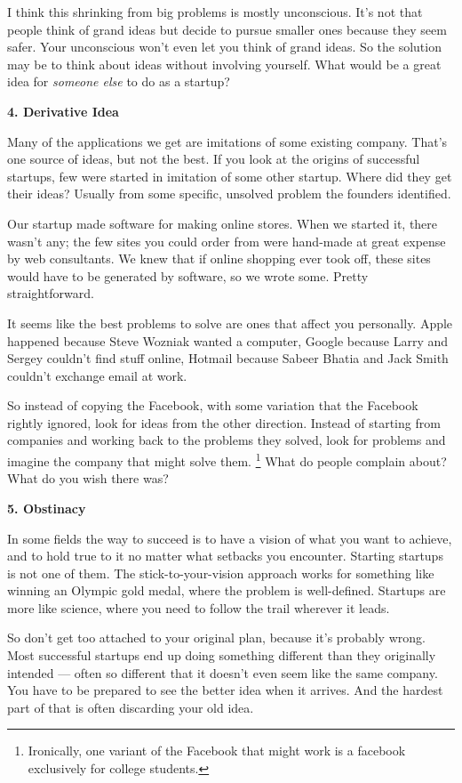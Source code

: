 \documentclass[12pt]{book}
\begin{document}
I think this shrinking from big problems is mostly unconscious. It's not
that people think of grand ideas but decide to pursue smaller ones
because they seem safer. Your unconscious won't even let you think of
grand ideas. So the solution may be to think about ideas without
involving yourself. What would be a great idea for \emph{someone else}
to do as a startup?

\textbf{4. Derivative Idea}

Many of the applications we get are imitations of some existing company.
That's one source of ideas, but not the best. If you look at the origins
of successful startups, few were started in imitation of some other
startup. Where did they get their ideas? Usually from some specific,
unsolved problem the founders identified.

Our startup made software for making online stores. When we started it,
there wasn't any; the few sites you could order from were hand-made at
great expense by web consultants. We knew that if online shopping ever
took off, these sites would have to be generated by software, so we
wrote some. Pretty straightforward.

It seems like the best problems to solve are ones that affect you
personally. Apple happened because Steve Wozniak wanted a computer,
Google because Larry and Sergey couldn't find stuff online, Hotmail
because Sabeer Bhatia and Jack Smith couldn't exchange email at work.

So instead of copying the Facebook, with some variation that the
Facebook rightly ignored, look for ideas from the other direction.
Instead of starting from companies and working back to the problems they
solved, look for problems and imagine the company that might solve them.
\footnote{Ironically, one variant of the Facebook that might work is a
facebook exclusively for college students.} What do people complain about? What do you wish
there was?

\textbf{5. Obstinacy}

In some fields the way to succeed is to have a vision of what you want
to achieve, and to hold true to it no matter what setbacks you
encounter. Starting startups is not one of them. The
stick-to-your-vision approach works for something like winning an
Olympic gold medal, where the problem is well-defined. Startups are more
like science, where you need to follow the trail wherever it leads.

So don't get too attached to your original plan, because it's probably
wrong. Most successful startups end up doing something different than
they originally intended --- often so different that it doesn't even
seem like the same company. You have to be prepared to see the better
idea when it arrives. And the hardest part of that is often discarding
your old idea.
\end{document}
